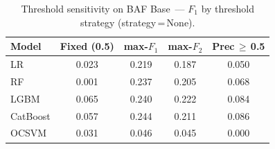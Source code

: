 \begin{table}[ht]
\centering
\caption{Threshold sensitivity on BAF Base~--- $F_1$ by threshold strategy (strategy\,=\,None).}
\label{tab:threshold_baf_f1}
\begin{tabular}{l c c c c}
\toprule
Model & Fixed (0.5) & max-$F_1$ & max-$F_2$ & Prec\,$\geq$\,0.5 \\
\midrule
LR         & 0.023 & 0.219 & 0.187 & 0.050 \\
RF         & 0.001 & 0.237 & 0.205 & 0.068 \\
LGBM       & 0.065 & 0.240 & 0.222 & 0.084 \\
CatBoost   & 0.057 & 0.244 & 0.211 & 0.086 \\
OCSVM      & 0.031 & 0.046 & 0.045 & 0.000 \\
\bottomrule
\end{tabular}
\end{table}